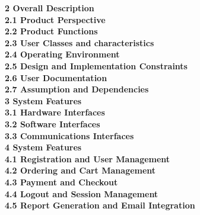 \documentclass{article}
\begin{document}
\textbf{2 Overall Description} \\
\hspace*{10mm}\textbf{2.1 Product Perspective} \\
\hspace*{10mm}\textbf{2.2 Product Functions} \\
\hspace*{10mm}\textbf{2.3 User Classes and characteristics } \\
\hspace*{10mm}\textbf{2.4 Operating Environment } \\
\hspace*{10mm}\textbf{2.5 Design and Implementation Constraints } \\
\hspace*{10mm}\textbf{2.6 User Documentation } \\
\hspace*{10mm}\textbf{2.7 Assumption and Dependencies } \\



\textbf{3 System Features} \\
\hspace*{10mm}\textbf{3.1 Hardware Interfaces } \\
\hspace*{10mm}\textbf{3.2 Software Interfaces } \\
\hspace*{10mm}\textbf{3.3 Communications Interfaces } \\


\textbf{4 System Features } \\
\hspace*{10mm}\textbf{4.1 Registration and User Management } \\
\hspace*{10mm}\textbf{4.2 Ordering and Cart Management } \\
\hspace*{10mm}\textbf{4.3 Payment and Checkout } \\
\hspace*{10mm}\textbf{4.4 Logout and Session Management } \\
\hspace*{10mm}\textbf{4.5 Report Generation and Email Integration } \\
\end{document}
